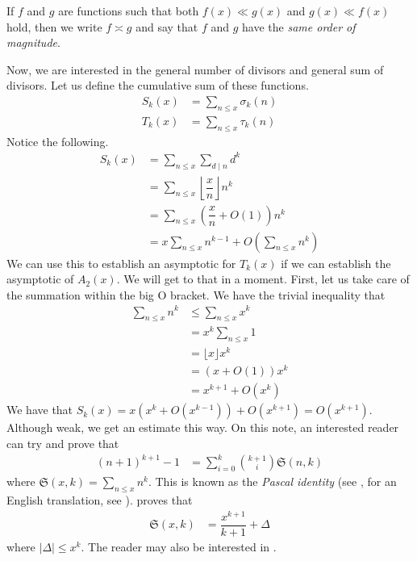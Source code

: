 \documentclass[elemannt.tex]{subfile}
\begin{document}
		\begin{definition}
			If $f$ and $g$ are functions such that both $f(x)\ll g(x)$ and $g(x)\ll f(x)$ hold, then we write $f\asymp g$ and say that $f$ and $g$ have the \textit{same order of magnitude}.
		\end{definition}\par
	Now, we are interested in the general number of divisors and general sum of divisors. Let us define the cumulative sum of these functions.
		\begin{align*}
			S_{k}(x)
				& = \sum_{n\leq x}\sigma_{k}(n)\\
			T_{k}(x)
				& = \sum_{n\leq x}\tau_{k}(n)
		\end{align*}
	Notice the following.
		\begin{align*}
			S_{k}(x)
				& = \sum_{n\leq x}\sum_{d\mid n}d^{k}\\
				& = \sum_{n\leq x}\left\lfloor{\dfrac{x}{n}}\right\rfloor n^{k}\\
				& = \sum_{n\leq x}\left(\dfrac{x}{n}+O(1)\right)n^{k}\\
				& = x\sum_{n\leq x}n^{k-1}+O\left(\sum_{n\leq x}n^{k}\right)
		\end{align*}
	We can use this to establish an asymptotic for $T_{k}(x)$ if we can establish the asymptotic of $A_{2}(x)$. We will get to that in a moment. First, let us take care of the summation within the big O bracket. We have the trivial inequality that
		\begin{align*}
			\sum_{n\leq x}n^{k}
				& \leq \sum_{n\leq x}x^{k}\\
				& = x^{k}\sum_{n\leq x}1\\
				& = \lfloor{x}\rfloor x^{k}\\
				& = (x+O(1))x^{k}\\
				& = x^{k+1}+O(x^{k})
		\end{align*}
	We have that $S_{k}(x)=x\left(x^{k}+O(x^{k-1})\right)+O(x^{k+1})=O(x^{k+1})$. Although weak, we get an estimate this way. On this note, an interested reader can try and prove that
		\begin{align*}
			(n+1)^{k+1}-1
				& =\sum_{i=0}^{k}\binom{k+1}{i}\mathfrak{S}(n,k)
		\end{align*}
	where $\mathfrak{S}(x,k)=\sum_{n\leq x}n^{k}$. This is known as the \textit{Pascal identity} (see \textcite{pascal_1964}, for an English translation, see \textcite{knoebel_laubenbacher_lodder_pengelley_2007}). \textcite[Chapter II, Theorem $1$]{lehmer_1900} proves that
		\begin{align}
			\mathfrak{S}(x,k)
				& = \dfrac{x^{k+1}}{k+1}+\Delta\label{eqn:lehmers}
		\end{align}
	where $|\Delta|\leq x^{k}$. The reader may also be interested in \textcite{kieren_macmillan_jonathan_sondow_2011}.
	
\end{document}
